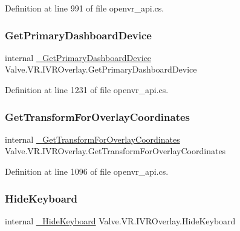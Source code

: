 Definition at line 991 of file openvr\+\_\+api.\+cs.

\mbox{\label{struct_valve_1_1_v_r_1_1_i_v_r_overlay_abe98e949dc6349843d42ccc22078be49}} 
\subsubsection{\texorpdfstring{GetPrimaryDashboardDevice}{GetPrimaryDashboardDevice}}
{\footnotesize\ttfamily internal \mbox{\hyperlink{struct_valve_1_1_v_r_1_1_i_v_r_overlay_ad8a44528c5a3aefe931435586391a25c}{\+\_\+\+Get\+Primary\+Dashboard\+Device}} Valve.\+V\+R.\+I\+V\+R\+Overlay.\+Get\+Primary\+Dashboard\+Device}



Definition at line 1231 of file openvr\+\_\+api.\+cs.

\mbox{\label{struct_valve_1_1_v_r_1_1_i_v_r_overlay_ab150fd8a577ba4296caa654c829ba44e}} 
\subsubsection{\texorpdfstring{GetTransformForOverlayCoordinates}{GetTransformForOverlayCoordinates}}
{\footnotesize\ttfamily internal \mbox{\hyperlink{struct_valve_1_1_v_r_1_1_i_v_r_overlay_a5b737a48531e2ce68c2dc7f2a6e374f9}{\+\_\+\+Get\+Transform\+For\+Overlay\+Coordinates}} Valve.\+V\+R.\+I\+V\+R\+Overlay.\+Get\+Transform\+For\+Overlay\+Coordinates}



Definition at line 1096 of file openvr\+\_\+api.\+cs.

\mbox{\label{struct_valve_1_1_v_r_1_1_i_v_r_overlay_a1e4a5e386003ceb8792837deefc1cfee}} 
\subsubsection{\texorpdfstring{HideKeyboard}{HideKeyboard}}
{\footnotesize\ttfamily internal \mbox{\hyperlink{struct_valve_1_1_v_r_1_1_i_v_r_overlay_acd7a1c9668b31dc428bd90a91d841841}{\+\_\+\+Hide\+Keyboard}} Valve.\+V\+R.\+I\+V\+R\+Overlay.\+Hide\+Keyboard}




